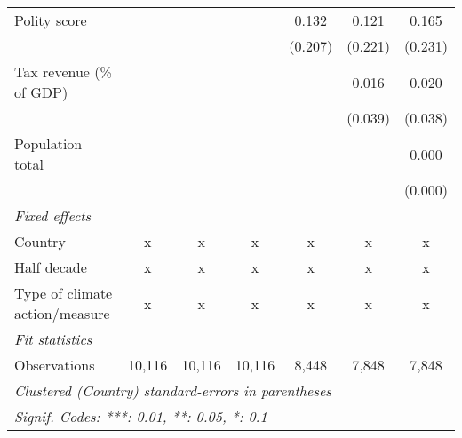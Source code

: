 \begin{tabular}{lcccccc}
   Polity score                                                                  &               &               &               & 0.132   & 0.121        & 0.165\\   
                                                                                 &               &               &               & (0.207) & (0.221)      & (0.231)\\   
   Tax revenue (\% of GDP)                                                       &               &               &               &         & 0.016        & 0.020\\   
                                                                                 &               &               &               &         & (0.039)      & (0.038)\\   
   Population total                                                              &               &               &               &         &              & 0.000\\   
                                                                                 &               &               &               &         &              & (0.000)\\   
   \emph{Fixed effects}\\
   Country                                                                       & x             & x             & x             & x       & x            & x\\  
   Half decade                                                                   & x             & x             & x             & x       & x            & x\\  
   Type of climate action/measure                                                & x             & x             & x             & x       & x            & x\\  
   \midrule \emph{Fit statistics}\\
   Observations                                                                  & 10,116        & 10,116        & 10,116        & 8,448   & 7,848        & 7,848\\  
   \midrule
   \multicolumn{7}{l}{\emph{Clustered (Country) standard-errors in parentheses}}\\
   \multicolumn{7}{l}{\emph{Signif. Codes: ***: 0.01, **: 0.05, *: 0.1}}\\
\end{tabular}
\par\endgroup


